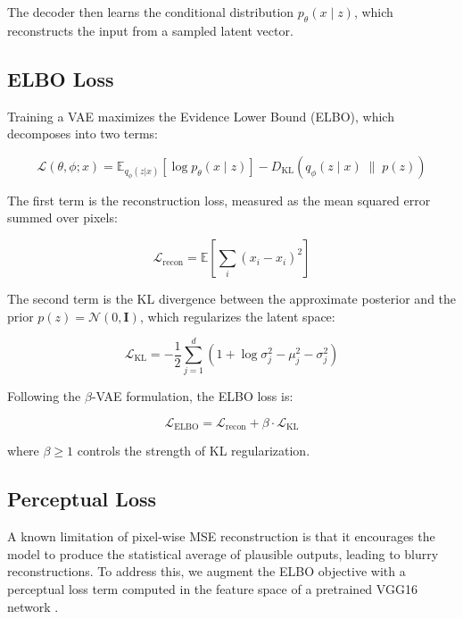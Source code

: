 \documentclass[11pt,a4paper]{article}
\begin{document}
The decoder then learns the conditional distribution $p_\theta(x \mid z)$, which reconstructs the input from a sampled latent vector.

\subsection{ELBO Loss}

Training a VAE maximizes the Evidence Lower Bound (ELBO), which decomposes into two terms:

\begin{equation}
    \mathcal{L}(\theta, \phi; x) = \mathbb{E}_{q_\phi(z|x)}\left[\log p_\theta(x \mid z)\right] - D_{\mathrm{KL}}\left(q_\phi(z \mid x) \;\|\; p(z)\right)
\end{equation}

The first term is the reconstruction loss, measured as the mean squared error summed over pixels:

\begin{equation}
    \mathcal{L}_{\mathrm{recon}} = \mathbb{E}\left[\sum_{i} (x_i - \hat{x}_i)^2\right]
\end{equation}

The second term is the KL divergence between the approximate posterior and the prior $p(z) = \mathcal{N}(0, \mathbf{I})$, which regularizes the latent space:

\begin{equation}
    \mathcal{L}_{\mathrm{KL}} = -\frac{1}{2} \sum_{j=1}^{d} \left(1 + \log \sigma_j^2 - \mu_j^2 - \sigma_j^2\right)
\end{equation}

Following the $\beta$-VAE formulation, the ELBO loss is:

\begin{equation}
    \mathcal{L}_{\mathrm{ELBO}} = \mathcal{L}_{\mathrm{recon}} + \beta \cdot \mathcal{L}_{\mathrm{KL}}
\end{equation}

where $\beta \geq 1$ controls the strength of KL regularization.

\subsection{Perceptual Loss}

A known limitation of pixel-wise MSE reconstruction is that it encourages the model to produce the statistical average of plausible outputs, leading to blurry reconstructions. To address this, we augment the ELBO objective with a perceptual loss term \cite{johnson2016perceptual} computed in the feature space of a pretrained VGG16 network \cite{simonyan2014vgg}.
\end{document}
